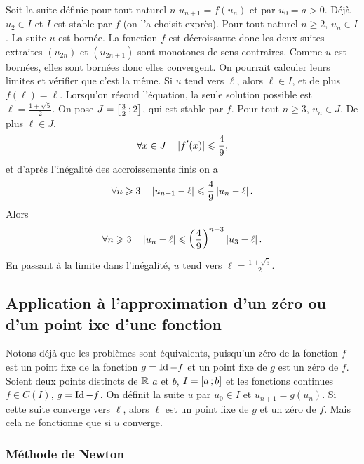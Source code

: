 Soit la suite définie pour tout naturel \(n\) \(u_{n+1}=f(u_n)\) et par \(u_0 = a>0\). Déjà \(u_2 \in I\) et \(I\) est stable par \(f\) (on l'a choisit exprès). Pour tout naturel \(n \geqslant 2\), \(u_n \in I\). La suite \(u\) est bornée. La fonction \(f\) est décroissante donc les deux suites extraites \((u_{2n})\) et \((u_{2n+1})\) sont monotones de sens contraires. Comme \(u\) est bornées, elles sont bornées donc elles convergent. On pourrait calculer leurs limites et vérifier que c'est la même. Si \(u\) tend vers \(\ell\), alors \(\ell \in I\), et de plus \(f(\ell)=\ell\). Lorsqu'on résoud l'équation, la seule solution possible est \(\ell=\frac{1+\sqrt{5}}{2}\). On pose \(J=\left[ \frac{3}{2} \, ;  2 \right]\), qui est stable par \(f\). Pour tout \(n \geqslant 3\), \(u_n \in J\). De plus \(\ell \in J\).
\begin{equation}
  \forall x \in J \quad \left\lvert f'(x)\right\rvert\leqslant \frac{4}{9},
\end{equation}
et d'après l'inégalité des accroissements finis on a
\begin{equation}
 \forall n \geqslant 3 \quad \left\lvert u_{n+1}-\ell\right\rvert  \leqslant \frac{4}{9} \left\lvert u_n-\ell\right\rvert.
\end{equation}
Alors
\begin{equation}
  \forall n \geqslant 3 \quad \left\lvert u_n-\ell\right\rvert \leqslant \left(\frac{4}{9}\right)^{n-3}\left\lvert u_3-\ell\right\rvert.
\end{equation}
En passant à la limite dans l'inégalité, \(u\) tend vers \(\ell=\frac{1+\sqrt{5}}{2}\).

\subsection{Application à l'approximation d'un zéro ou d'un point ixe d'une fonction}

Notons déjà que les problèmes sont équivalents, puisqu'un zéro de la fonction \(f\) est un point fixe de la fonction \(g=\operatorname{Id}-f\) et un point fixe de \(g\) est un zéro de \(f\). Soient deux points distincts de \(\mathbb{R}\) \(a\) et \(b\), \(I=\left[ a \, ;  b \right]\) et les fonctions continues \(f \in \mathit{C}(I)\), \(g=\operatorname{Id} - f\). On définit la suite \(u\) par \(u_0 \in I\) et \(u_{n+1}=g(u_n)\). Si cette suite converge vers \(\ell\), alors \(\ell\) est un point fixe de \(g\) et un zéro de \(f\). Mais cela ne fonctionne que si \(u\) converge.

\subsubsection{Méthode de Newton}


